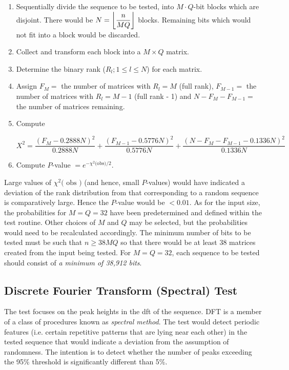 \begin{enumerate}
    \item Sequentially divide the sequence to be tested, into $M \cdot Q$-bit blocks which are disjoint. There would be $N = \floor*{\dfrac{n}{MQ}}$ blocks. Remaining bits which would not fit into a block would be discarded.
    
    \item Collect and transform each block into a $M \times Q$ matrix.
    
    \item Determine the binary rank ($R_l; 1 \leq l \leq N$) for each matrix.
    
    \item Assign $F_M = $ the number of matrices with $R_l = M$ (full rank), $F_{M - 1}= $ the number of matrices with $R_l = M - 1$ (full rank - 1) and $N - F_{M} - F_{M - 1}= $ the number of matrices remaining.
    
    \item Compute 
    
    \[\scriptstyle
    X^2 = \dfrac{(F_M  - 0.2888N)^2}{0.2888N} + \dfrac{(F_{M-1}  - 0.5776N)^2}{0.5776N} + \dfrac{(N - F_M - F_{M-1}  - 0.1336N)^2}{0.1336N}
    \]
    
    \item Compute $P$-value $ = e^{-\chi^2\text{(obs)} / 2}$.
\end{enumerate}

Large values of $\chi^2\text{( obs )}$ (and hence, small $P$-values) would have indicated a deviation of the rank distribution from that corresponding to a random sequence is comparatively large. Hence the $P$-value would be $< 0.01$. As for the input size, the probabilities for $M = Q = 32$ have been predetermined and defined within the test routine. Other choices of $M$ and $Q$ may be selected, but the probabilities would need to be recalculated accordingly. The minimum number of bits to be tested must be such that $n \geq 38MQ$ so that there would be at least 38 matrices created from the input being tested. For $M = Q = 32$, each sequence to be tested should consist of \textit{a minimum of 38,912 bits}.

\subsection{Discrete Fourier Transform (Spectral) Test}

The test focuses on the peak heights in the \acrfull{dft} of the sequence. DFT is a member of a class of procedures known as \textit{spectral method}. The test would detect periodic features (i.e. certain repetitive patterns that are lying near each other) in the tested sequence that would indicate a deviation from the assumption of randomness. The intention is to detect whether the number of peaks exceeding the 95\% threshold is significantly different than 5\%.

